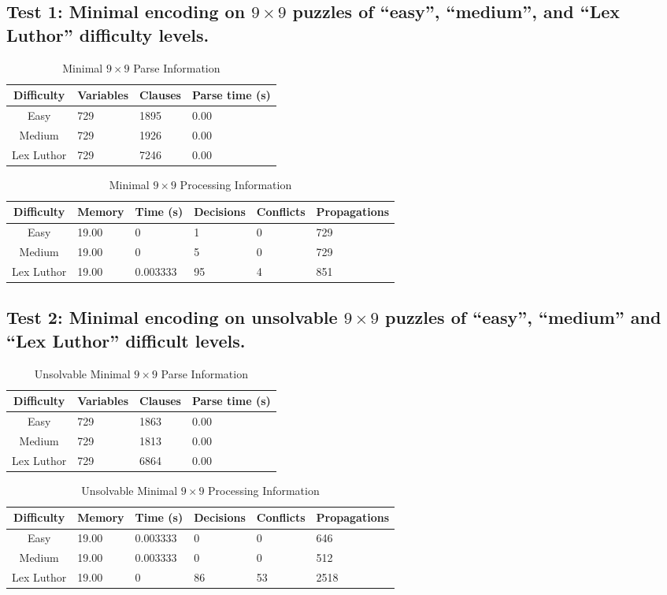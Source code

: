 \documentclass[conference,draftclsnofoot]{IEEEtran}
\begin{document}
\subsection{Test 1: Minimal encoding on $9 \times 9$ puzzles of ``easy'', ``medium'',
and ``Lex Luthor'' difficulty levels.}
\FloatBarrier
\begin{table}[!h]
	\centering
	\begin{tabular}{c | l l l}
		Difficulty & Variables & Clauses & Parse time (s) \\\hline
		Easy 		& 729 & 1895 & 0.00 \\
		Medium 		& 729 & 1926 & 0.00 \\
		Lex Luthor 	& 729 & 7246 & 0.00
	\end{tabular}
	\caption{Minimal $9 \times 9$ Parse Information}
	\label{tab:minimal_9x9_parse}
\end{table}
\begin{table}[!h]
	\centering

	\begin{tabular}{c | l l p{20pt} p{20pt} l}
		Difficulty & Memory & Time (s) & Decisions &
		Conflicts & Propagations \\\hline
		Easy 		& 19.00 & 0 		& 1  & 0 & 729\\
		Medium 		& 19.00 & 0 		& 5  & 0 & 729\\
		Lex Luthor 	& 19.00 & 0.003333 	& 95 & 4 & 851
	\end{tabular}
	\caption{Minimal $9 \times 9$ Processing Information}
	\label{tab:minimal_9x9_proc}
\end{table}
\FloatBarrier

\subsection{Test 2: Minimal encoding on unsolvable $9 \times 9$ puzzles of ``easy'',
``medium'' and ``Lex Luthor'' difficult levels.}
\FloatBarrier
\begin{table}[!h]
	\centering
	\begin{tabular}{c | l l l}
		Difficulty & Variables &  Clauses & Parse time (s) \\\hline
		Easy 		& 729 & 1863 & 0.00 \\
		Medium 		& 729 & 1813 & 0.00 \\
		Lex Luthor 	& 729 & 6864 & 0.00
	\end{tabular}
	\caption{Unsolvable Minimal $9 \times 9$ Parse Information}
	\label{tab:minimal_9x9_unsolvable_parse}
\end{table}
\begin{table}[!h]
	\centering
	\begin{tabular}{c | l l p{20pt} p{20pt}  l }
		Difficulty & Memory & Time (s) & Decisions &
		Conflicts & Propagations \\\hline
		Easy 		& 19.00 & 0.003333 & 0  & 0  & 646 \\
		Medium 		& 19.00 & 0.003333 & 0  & 0  & 512 \\
		Lex Luthor 	& 19.00 & 0 	   & 86 & 53 & 2518
	\end{tabular}
	\caption{Unsolvable Minimal $9 \times 9$ Processing Information}
	\label{tab:minimal_9x9_unsolvable_proc}
\end{table}
\FloatBarrier
\end{document}
